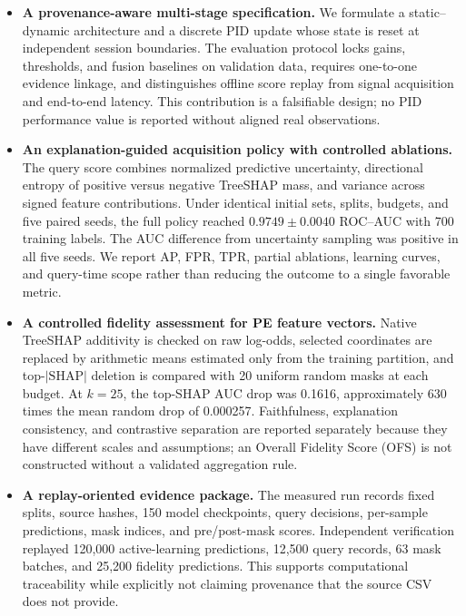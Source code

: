 \begin{itemize}
    \item \textbf{A provenance-aware multi-stage specification.} We formulate a
    static--dynamic architecture and a discrete PID update whose state is reset at
    independent session boundaries. The evaluation protocol locks gains,
    thresholds, and fusion baselines on validation data, requires one-to-one
    evidence linkage, and distinguishes offline score replay from signal
    acquisition and end-to-end latency. This contribution is a falsifiable design;
    no PID performance value is reported without aligned real observations.

    \item \textbf{An explanation-guided acquisition policy with controlled
    ablations.} The query score combines normalized predictive uncertainty,
    directional entropy of positive versus negative TreeSHAP mass, and variance
    across signed feature contributions. Under identical initial sets, splits,
    budgets, and five paired seeds, the full policy reached
    $0.9749\pm0.0040$ ROC--AUC with 700 training labels. The AUC difference from
    uncertainty sampling was positive in all five seeds. We report AP, FPR, TPR,
    partial ablations, learning curves, and query-time scope rather than reducing
    the outcome to a single favorable metric.

    \item \textbf{A controlled fidelity assessment for PE feature vectors.}
    Native TreeSHAP additivity is checked on raw log-odds, selected coordinates
    are replaced by arithmetic means estimated only from the training partition,
    and top-$|\mathrm{SHAP}|$ deletion is compared with 20 uniform random masks at
    each budget. At $k=25$, the top-SHAP AUC drop was 0.1616, approximately 630
    times the mean random drop of 0.000257. Faithfulness, explanation consistency,
    and contrastive separation are reported separately because they have
    different scales and assumptions; an Overall Fidelity Score (OFS) is not
    constructed without a validated aggregation rule.

    \item \textbf{A replay-oriented evidence package.} The measured run records
    fixed splits, source hashes, 150 model checkpoints, query decisions,
    per-sample predictions, mask indices, and pre/post-mask scores. Independent
    verification replayed 120,000 active-learning predictions, 12,500 query
    records, 63 mask batches, and 25,200 fidelity predictions. This supports
    computational traceability while explicitly not claiming provenance that the
    source CSV does not provide.
\end{itemize}

